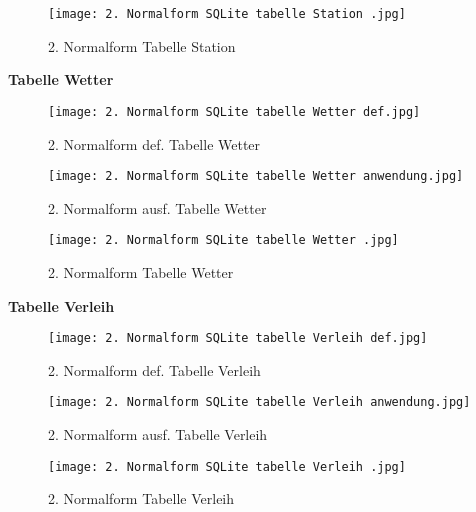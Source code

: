 \documentclass{article}
\begin{document}
\centering{\Huge\textbf{$\downarrow$}}

\begin{figure}[H]
    \centering
    \texttt{[image: 2. Normalform SQLite tabelle Station .jpg]}
    \caption{2. Normalform Tabelle Station}
    \label{fig:enter-label}
\end{figure}

\centering\textbf{Tabelle Wetter}

\begin{figure}[H]
      \begin{minipage}{0.45\textwidth}
      \texttt{[image: 2. Normalform SQLite tabelle Wetter def.jpg]}
      \caption{2. Normalform def. Tabelle Wetter }
      \end{minipage}\hfill
      \begin{minipage}{0.45\textwidth}
      \texttt{[image: 2. Normalform SQLite tabelle Wetter anwendung.jpg]}
      \caption{2. Normalform ausf. Tabelle Wetter}  
      \end{minipage}
  \end{figure}  

\centering{\Huge\textbf{$\downarrow$}}

\begin{figure}[H]
    \centering
    \texttt{[image: 2. Normalform SQLite tabelle Wetter .jpg]}
    \caption{2. Normalform Tabelle Wetter}
    \label{fig:enter-label}
\end{figure}


\centering\textbf{Tabelle Verleih}

\begin{figure}[H]
      \begin{minipage}{0.45\textwidth}
      \texttt{[image: 2. Normalform SQLite tabelle Verleih def.jpg]}
      \caption{2. Normalform def. Tabelle Verleih }
      \end{minipage}\hfill
      \begin{minipage}{0.45\textwidth}
      \texttt{[image: 2. Normalform SQLite tabelle Verleih anwendung.jpg]}
      \caption{2. Normalform ausf. Tabelle Verleih}  
      \end{minipage}
  \end{figure}  

\centering{\Huge\textbf{$\downarrow$}}

\begin{figure}[H]
    \centering
    \texttt{[image: 2. Normalform SQLite tabelle Verleih .jpg]}
    \caption{2. Normalform Tabelle Verleih}
    \label{fig:enter-label}
\end{figure}
\end{document}
